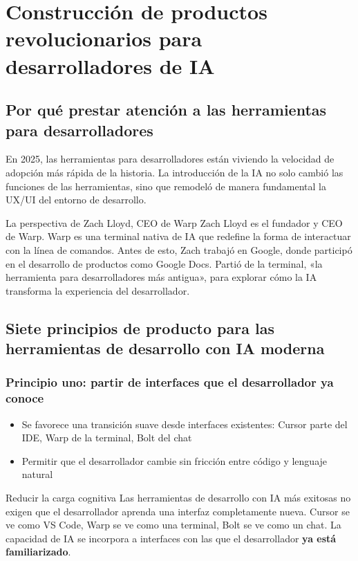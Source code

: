 \section{Construcción de productos revolucionarios para desarrolladores de IA}

\subsection{Por qué prestar atención a las herramientas para desarrolladores}

En 2025, las herramientas para desarrolladores están viviendo la velocidad de adopción más rápida de la historia. La introducción de la IA no solo cambió las funciones de las herramientas, sino que remodeló de manera fundamental la UX/UI del entorno de desarrollo.

\begin{knowledgebox}{La perspectiva de Zach Lloyd, CEO de Warp}
Zach Lloyd es el fundador y CEO de Warp. Warp es una terminal nativa de IA que redefine la forma de interactuar con la línea de comandos. Antes de esto, Zach trabajó en Google, donde participó en el desarrollo de productos como Google Docs. Partió de la terminal, «la herramienta para desarrolladores más antigua», para explorar cómo la IA transforma la experiencia del desarrollador.
\end{knowledgebox}

\subsection{Siete principios de producto para las herramientas de desarrollo con IA moderna}

\subsubsection{Principio uno: partir de interfaces que el desarrollador ya conoce}

\begin{itemize}
    \item Se favorece una transición suave desde interfaces existentes: Cursor parte del IDE, Warp de la terminal, Bolt del chat
    \item Permitir que el desarrollador cambie sin fricción entre código y lenguaje natural
\end{itemize}

\begin{importantbox}{Reducir la carga cognitiva}
Las herramientas de desarrollo con IA más exitosas no exigen que el desarrollador aprenda una interfaz completamente nueva. Cursor se ve como VS Code, Warp se ve como una terminal, Bolt se ve como un chat. La capacidad de IA se incorpora a interfaces con las que el desarrollador \textbf{ya está familiarizado}.
\end{importantbox}

